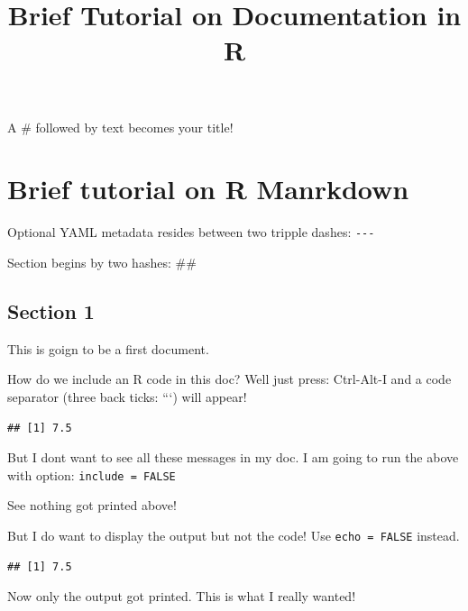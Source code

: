 \documentclass[12pt,]{article}
\title{Brief Tutorial on Documentation in R}
\author{}
\date{}
\newenvironment{Shaded}{\begin{snugshade}}{\end{snugshade}}
\newcommand{\KeywordTok}[1]{\textcolor[rgb]{0.13,0.29,0.53}{\textbf{{#1}}}}
\newcommand{\DataTypeTok}[1]{\textcolor[rgb]{0.13,0.29,0.53}{{#1}}}
\newcommand{\StringTok}[1]{\textcolor[rgb]{0.31,0.60,0.02}{{#1}}}
\newcommand{\NormalTok}[1]{{#1}}
\begin{document}
\maketitle

{
\hypersetup{linkcolor=black}
\setcounter{tocdepth}{2}
\tableofcontents
}
A \# followed by text becomes your title!

\section{Brief tutorial on R
Manrkdown}\label{brief-tutorial-on-r-manrkdown}

Optional YAML metadata resides between two tripple dashes:
\texttt{-\/-\/-}

Section begins by two hashes: \#\#

\subsection{Section 1}\label{section-1}

This is goign to be a first document.

How do we include an R code in this doc? Well just press: Ctrl-Alt-I and
a code separator (three back ticks: ```) will appear!

\begin{Shaded}
\end{Shaded}

\begin{verbatim}
## [1] 7.5
\end{verbatim}

But I dont want to see all these messages in my doc. I am going to run
the above with option: \texttt{include\ =\ FALSE}

See nothing got printed above!

But I do want to display the output but not the code! Use
\texttt{echo\ =\ FALSE} instead.

\begin{verbatim}
## [1] 7.5
\end{verbatim}

Now only the output got printed. This is what I really wanted!
\end{document}
